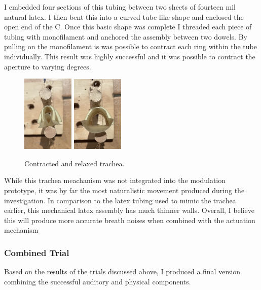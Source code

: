 \documentclass[letterpaper]{article}
\begin{document}
I embedded four sections of this tubing between two sheets of fourteen mil natural latex. I then bent this into a curved tube-like shape and enclosed the open end of the C. Once this basic shape was complete I threaded each piece of tubing with monofilament and anchored the assembly between two dowels. By pulling on the monofilament is was possible to contract each ring within the tube individually. This result was highly successful and it was possible to contract the aperture to varying degrees.

\begin{figure}[h]
\centering
\includegraphics[width=0.22\textwidth]{images/46.JPG}
\includegraphics[width=0.22\textwidth]{images/52.JPG}
\caption{Contracted and relaxed trachea.}
\end{figure}

While this trachea meachanism was not integrated into the modulation prototype, it was by far the most naturalistic movement produced during the investigation. In comparison to the latex tubing used to mimic the trachea earlier, this mechanical latex assembly has much thinner walls. Overall, I believe this will produce more accurate breath noises when combined with the actuation mechanism

\subsubsection{Combined Trial}

Based on the results of the trials discussed above, I produced a final version combining the successful auditory and physical components.
\end{document}
